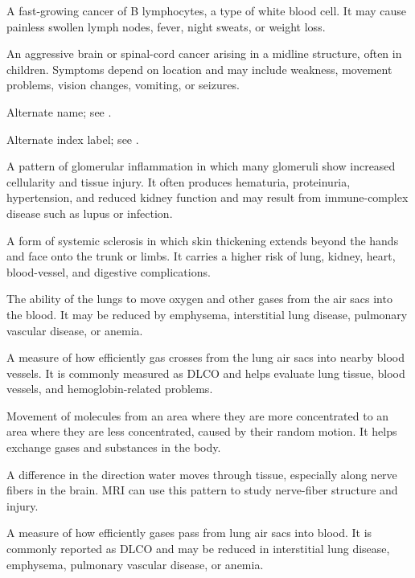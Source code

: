  A fast-growing cancer of B lymphocytes, a type of white blood cell. It may cause painless swollen lymph nodes, fever, night sweats, or weight loss.

 An aggressive brain or spinal-cord cancer arising in a midline structure, often in children. Symptoms depend on location and may include weakness, movement problems, vision changes, vomiting, or seizures.


 Alternate name; see .

 Alternate index label; see .

 A pattern of glomerular inflammation in which many glomeruli show increased cellularity and tissue injury. It often produces hematuria, proteinuria, hypertension, and reduced kidney function and may result from immune-complex disease such as lupus or infection.

 A form of systemic sclerosis in which skin thickening extends beyond the hands and face onto the trunk or limbs. It carries a higher risk of lung, kidney, heart, blood-vessel, and digestive complications.

 The ability of the lungs to move oxygen and other gases from the air sacs into the blood. It may be reduced by emphysema, interstitial lung disease, pulmonary vascular disease, or anemia.

 A measure of how efficiently gas crosses from the lung air sacs into nearby blood vessels. It is commonly measured as DLCO and helps evaluate lung tissue, blood vessels, and hemoglobin-related problems.

 Movement of molecules from an area where they are more concentrated to an area where they are less concentrated, caused by their random motion. It helps exchange gases and substances in the body.

 A difference in the direction water moves through tissue, especially along nerve fibers in the brain. MRI can use this pattern to study nerve-fiber structure and injury.

 A measure of how efficiently gases pass from lung air sacs into blood. It is commonly reported as DLCO and may be reduced in interstitial lung disease, emphysema, pulmonary vascular disease, or anemia.

